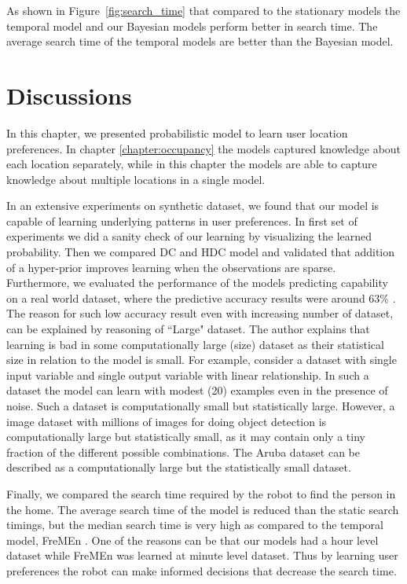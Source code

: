 As shown in Figure~\ref{fig:search_time} that compared to the stationary models the temporal model and our Bayesian models perform better in search time. The average search time of the temporal models are better than the Bayesian model.

\section{Discussions}

In this chapter, we presented probabilistic model to learn user location preferences.  In chapter \ref{chapter:occupancy} the models captured knowledge about each location separately, while in this chapter the models are able to capture knowledge about multiple locations in a single model. 

In an extensive experiments on synthetic dataset, we found that our model is capable of learning underlying patterns in user preferences. In first set of experiments we did a sanity check of our learning by visualizing the learned probability. Then we compared DC and HDC model and validated that addition of a hyper-prior improves learning when the observations are sparse. Furthermore, we evaluated the performance of the models predicting capability on a real world dataset, where the predictive accuracy results were around 63\% . The reason for such low accuracy result even with increasing number of dataset, can be explained by \cite{Bishop20120222} reasoning of ``Large" dataset. The author explains that learning is bad in some computationally large  (size) dataset as their statistical size in relation to the model is small. For example, consider a dataset with single input variable and single output variable with linear relationship. In such a dataset the model can learn with modest (20) examples even in the presence of noise. Such a dataset is computationally small but statistically large. However, a image dataset with millions of images for doing object detection is computationally large but statistically small, as it may contain only a tiny fraction of the different possible combinations. The Aruba dataset can be described as a computationally large but the statistically small dataset.

Finally, we compared the search time required by the robot to find the person in the home. The average search time of the model is reduced than the static search timings, but the median search time is very high as compared to the temporal model, FreMEn \citep{krajnik_wheres_2015}. One of the reasons can be that our models had a hour level dataset while FreMEn was learned at minute level dataset. Thus by learning user preferences the robot can make informed decisions that decrease the search time.





